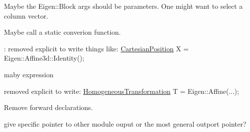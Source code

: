 
\begin{DoxyRefList}
\item[\label{todo__todo000005}%
\hypertarget{todo__todo000005}{}%
 Class \hyperlink{structEigen_1_1internal_1_1traits_3_01QuaternionRef_3_01__Derived_01_4_01_4}{Eigen\+:\+:internal\+:\+:traits$<$ Quaternion\+Ref$<$ \+\_\+\+Derived $>$ $>$} ]Maybe the Eigen\+::\+Block args should be parameters. One might want to select a column vector.  
\item[\label{todo__todo000001}%
\hypertarget{todo__todo000001}{}%
Member \hyperlink{classow__core_1_1AngularPositionRef_a0c67d3e57001c3f4b47983c6e2113410}{ow\+\_\+core\+:\+:Angular\+Position\+Ref$<$ \+\_\+\+Derived $>$\+:\+:operator=} (const tf\+::\+Quaternion \&q)]Maybe call a static converion function. 
\item[\label{todo__todo000003}%
\hypertarget{todo__todo000003}{}%
Member \hyperlink{classow__core_1_1CartesianPosition_a87716f0f5fd8a5ddfc1a18fb9205c4fe}{ow\+\_\+core\+:\+:Cartesian\+Position$<$ \+\_\+\+Scalar $>$\+:\+:Cartesian\+Position} (const Transform \&other)]\+: removed explicit to write things like\+: \hyperlink{classow__core_1_1CartesianPosition}{Cartesian\+Position} X = Eigen\+::\+Affine3d\+::\+Identity();  
\item[\label{todo__todo000002}%
\hypertarget{todo__todo000002}{}%
Member \hyperlink{classow__core_1_1CartesianPosition_adf7c4725b0e7c01554d431f1277b7380}{ow\+\_\+core\+:\+:Cartesian\+Position$<$ \+\_\+\+Scalar $>$\+:\+:Identity} ()]maby expression  
\item[\label{todo__todo000007}%
\hypertarget{todo__todo000007}{}%
Member \hyperlink{classow__core_1_1HomogeneousTransformation_ac1d8792424c0af25dffd0c7e38981caa}{ow\+\_\+core\+:\+:Homogeneous\+Transformation$<$ \+\_\+\+Scalar $>$\+:\+:Homogeneous\+Transformation} (const Base \&other)]removed explicit to write\+: \hyperlink{classow__core_1_1HomogeneousTransformation}{Homogeneous\+Transformation} T = Eigen\+::\+Affine(...);  
\item[\label{todo__todo000008}%
\hypertarget{todo__todo000008}{}%
Class \hyperlink{classow__core_1_1IFootTrajectoryGenerator}{ow\+\_\+core\+:\+:I\+Foot\+Trajectory\+Generator} ]Remove forward declarations.  
\item[\label{todo__todo000009}%
\hypertarget{todo__todo000009}{}%
Member \hyperlink{classow__core_1_1IFootTrajectoryGenerator_ac18698993d68a408ecb0820b1ce0cf4e}{ow\+\_\+core\+:\+:I\+Foot\+Trajectory\+Generator\+:\+:connect\+In\+Port\+Foot\+Step\+Planner} (const I\+Foot\+Step\+Planner\+Out\+Ports $\ast$fsp)=0]give specific pointer to other module ouput or the most general outport pointer? 

\end{DoxyRefList}
